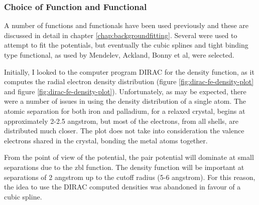 \subsubsection{Choice of Function and Functional}

A number of functions and functionals have been used previously and these are discussed in detail in chapter \ref{chap:backgroundfitting}.  Several were used to attempt to fit the potentials, but eventually the cubic splines and tight binding type functional, as used by Mendelev, Ackland, Bonny et al, were selected.

Initially, I looked to the computer program DIRAC for the density function, as it computes the radial electron density distribution (figure \ref{fig:dirac-fe-density-plot} and figure \ref{fig:dirac-fe-density-plot}).  Unfortunately, as may be expected, there were a number of issues in using the density distribution of a single atom.  The atomic separation for both iron and palladium, for a relaxed crystal, begins at approximately 2-2.5 angstrom, but most of the electrons, from all shells, are distributed much closer.  The plot does not take into consideration the valence electrons shared in the crystal, bonding the metal atoms together.

From the point of view of the potential, the pair potential will dominate at small separations due to the \acrshort{zbl} function.  The density function will be important at separations of 2 angstrom up to the cutoff radius (5-6 angstrom).  For this reason, the idea to use the DIRAC computed densities was abandoned in favour of a cubic spline.

